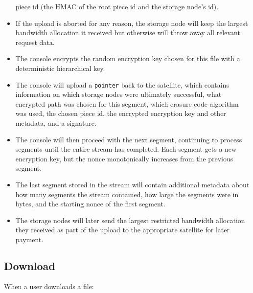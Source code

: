 \documentclass[11pt,fleqn,openany]{book}
\newcommand{\x}[1]{{\tt #1}} \newcommand{\code}[1]{{\tt #1}}
\begin{document}
\begin{itemize}
  piece
  id (the HMAC of the root piece id and the storage node's id).
\item If the upload is aborted for any reason, the storage node will keep the
  largest bandwidth allocation it received but otherwise will throw away all
  relevant request data.
\item The console encrypts the random encryption key chosen for this file
  with a deterministic hierarchical key.
\item The console will upload a \x{pointer} back to the satellite, which
  contains information on which storage nodes were
  ultimately successful, what encrypted path was chosen for this segment, which
  erasure code algorithm was used, the chosen piece id, the
  encrypted encryption key and other metadata, and a signature.
\item The console will then proceed with the next segment, continuing to
  process segments until the entire stream has completed. Each segment gets
  a new encryption key, but the nonce monotonically increases from the previous
  segment.
\item The last segment stored in the stream will contain additional metadata
  about how many segments the stream contained, how large the segments were
  in bytes, and the starting nonce of the first segment.
\item The storage nodes will later send the largest restricted
  bandwidth allocation they received as part of the upload to the appropriate
  satellite for later payment.
\end{itemize}

\subsection{Download}

When a user downloads a file:
\end{document}
